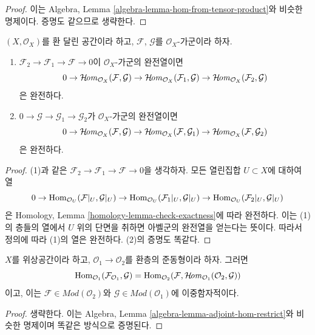 \begin{proof}
이는 Algebra, Lemma \ref{algebra-lemma-hom-from-tensor-product}와
비슷한 명제이다. 증명도 같으므로 생략한다.
\end{proof}

\begin{lemma}
\label{lemma-internal-hom-exact}
$(X, \mathcal{O}_X)$를 환 달린 공간이라 하고,
$\mathcal{F}$, $\mathcal{G}$를 $\mathcal{O}_X$-가군이라 하자.
\begin{enumerate}
\item $\mathcal{F}_2 \to \mathcal{F}_1 \to \mathcal{F} \to 0$이
$\mathcal{O}_X$-가군의 완전열이면
$$
0 \to
\mathop{\mathcal{H}\!\mathit{om}}\nolimits_{\mathcal{O}_X}(\mathcal{F}, \mathcal{G}) \to
\mathop{\mathcal{H}\!\mathit{om}}\nolimits_{\mathcal{O}_X}(\mathcal{F}_1, \mathcal{G}) \to
\mathop{\mathcal{H}\!\mathit{om}}\nolimits_{\mathcal{O}_X}(\mathcal{F}_2, \mathcal{G})
$$
은 완전하다.
\item $0 \to \mathcal{G} \to \mathcal{G}_1 \to \mathcal{G}_2$가
$\mathcal{O}_X$-가군의 완전열이면
$$
0 \to
\mathop{\mathcal{H}\!\mathit{om}}\nolimits_{\mathcal{O}_X}(\mathcal{F}, \mathcal{G}) \to
\mathop{\mathcal{H}\!\mathit{om}}\nolimits_{\mathcal{O}_X}(\mathcal{F}, \mathcal{G}_1) \to
\mathop{\mathcal{H}\!\mathit{om}}\nolimits_{\mathcal{O}_X}(\mathcal{F}, \mathcal{G}_2)
$$
은 완전하다.
\end{enumerate}
\end{lemma}

\begin{proof}
(1)과 같은 $\mathcal{F}_2 \to \mathcal{F}_1 \to \mathcal{F} \to 0$을
생각하자. 모든 열린집합 $U \subset X$에 대하여 열
$$
0 \to \mathop{\mathrm{Hom}}\nolimits_{\mathcal{O}_U}(\mathcal{F}|_U, \mathcal{G}|_U) \to
\mathop{\mathrm{Hom}}\nolimits_{\mathcal{O}_U}(\mathcal{F}_1|_U, \mathcal{G}|_U) \to
\mathop{\mathrm{Hom}}\nolimits_{\mathcal{O}_U}(\mathcal{F}_2|_U, \mathcal{G}|_U)
$$
은 Homology, Lemma \ref{homology-lemma-check-exactness}에 따라 완전하다.
이는 (1)의 층들의 열에서 $U$ 위의 단면을 취하면 아벨군의 완전열을
얻는다는 뜻이다. 따라서 정의에 따라 (1)의 열은 완전하다.
(2)의 증명도 똑같다.
\end{proof}

\begin{lemma}
\label{lemma-adjoint-tensor-restrict}
$X$를 위상공간이라 하고, $\mathcal{O}_1 \to \mathcal{O}_2$를
환층의 준동형이라 하자. 그러면
$$
\mathop{\mathrm{Hom}}\nolimits_{\mathcal{O}_1}(\mathcal{F}_{\mathcal{O}_1}, \mathcal{G}) =
\mathop{\mathrm{Hom}}\nolimits_{\mathcal{O}_2}(\mathcal{F},
\mathop{\mathcal{H}\!\mathit{om}}\nolimits_{\mathcal{O}_1}(\mathcal{O}_2, \mathcal{G}))
$$
이고, 이는 $\mathcal{F} \in \textit{Mod}(\mathcal{O}_2)$와
$\mathcal{G} \in \textit{Mod}(\mathcal{O}_1)$에 이중함자적이다.
\end{lemma}

\begin{proof}
생략한다. 이는 Algebra, Lemma \ref{algebra-lemma-adjoint-hom-restrict}와
비슷한 명제이며 똑같은 방식으로 증명된다.
\end{proof}

